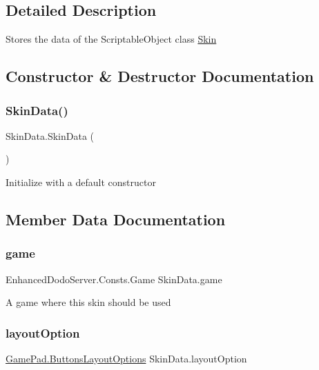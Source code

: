 \subsection{Detailed Description}
Stores the data of the Scriptable\+Object class \mbox{\hyperlink{class_skin}{Skin}} 



\subsection{Constructor \& Destructor Documentation}
\mbox{\label{class_skin_data_a367ece792b787e086e03151342a7af91}} 
\subsubsection{\texorpdfstring{SkinData()}{SkinData()}}
{\footnotesize\ttfamily Skin\+Data.\+Skin\+Data (\begin{DoxyParamCaption}{ }\end{DoxyParamCaption})}



Initialize with a default constructor 



\subsection{Member Data Documentation}
\mbox{\label{class_skin_data_a2060d1b97558d486f33d51d17fd074be}} 
\subsubsection{\texorpdfstring{game}{game}}
{\footnotesize\ttfamily Enhanced\+Dodo\+Server.\+Consts.\+Game Skin\+Data.\+game}



A game where this skin should be used 

\mbox{\label{class_skin_data_a9d1a9f6e0a92e6e42801c2145a892ebb}} 
\subsubsection{\texorpdfstring{layoutOption}{layoutOption}}
{\footnotesize\ttfamily \mbox{\hyperlink{namespace_game_pad_ad65f651e47321df25402246e8df26c37}{Game\+Pad.\+Buttons\+Layout\+Options}} Skin\+Data.\+layout\+Option}



